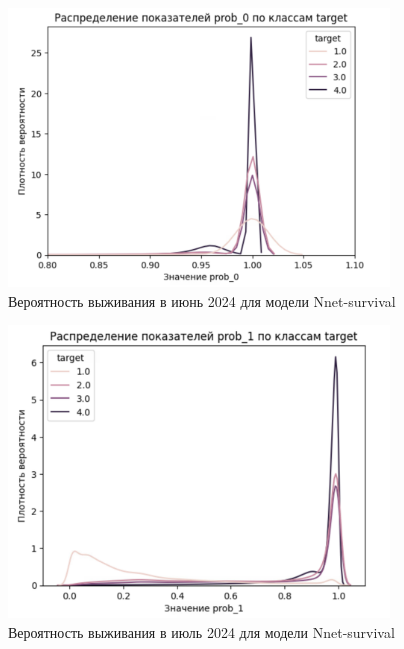 \documentclass[a4paper,14pt,oneside,openany]{memoir}
\begin{document}
\begin{figure}[H]
	\includegraphics[width=0.9\textwidth]{../figures/prob_0_nnet.png}
	\caption{Вероятность выживания в июнь 2024 для модели Nnet-survival}
\end{figure}

\begin{figure}[H]
	\includegraphics[width=0.9\textwidth]{../figures/prob_1_nnet.png}
	\caption{Вероятность выживания в июль 2024 для модели Nnet-survival}
\end{figure}
\end{document}
